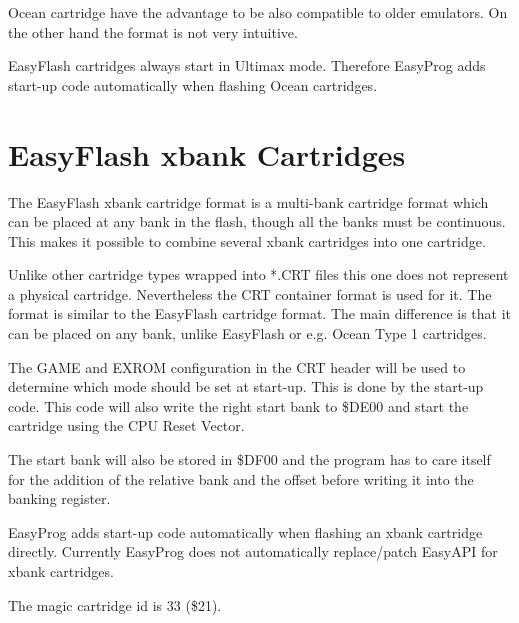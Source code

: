 \documentclass[a4paper,oneside]{memoir}
\begin{document}
Ocean cartridge have the advantage to be also compatible to older emulators. On
the other hand the format is not very intuitive.

EasyFlash cartridges always start in Ultimax mode. Therefore EasyProg adds
start-up code automatically when flashing Ocean cartridges.


\chapter{EasyFlash xbank Cartridges}

The EasyFlash xbank cartridge format is a multi-bank cartridge format which can
be placed at any bank in the flash, though all the banks must be continuous.
This makes it possible to combine several xbank cartridges into one cartridge.

Unlike other cartridge types wrapped into *.CRT files this one does not
represent a physical cartridge. Nevertheless the CRT container format is used
for it. The format is similar to the EasyFlash cartridge format. The main
difference is that it can be placed on any bank, unlike EasyFlash or e.g. Ocean
Type 1 cartridges.

The GAME and EXROM configuration in the CRT header will be used to determine
which mode should be set at start-up. This is done by the start-up code. This
code will also write the right start bank to \$DE00 and start the cartridge
using the CPU Reset Vector.

The start bank will also be stored in \$DF00 and the program has to care itself
for the addition of the relative bank and the offset before writing it into the
banking register.

EasyProg adds start-up code automatically when flashing an xbank cartridge
directly. Currently EasyProg does not automatically replace/patch EasyAPI for
xbank cartridges.

The magic cartridge id is 33 (\$21).
\end{document}
